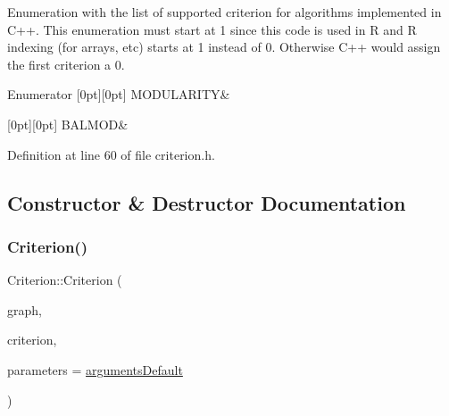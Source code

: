 Enumeration with the list of supported criterion for algorithms implemented in C++. This enumeration must start at 1 since this code is used in R and R indexing (for arrays, etc) starts at 1 instead of 0. Otherwise C++ would assign the first criterion a 0. \begin{DoxyEnumFields}{Enumerator}
[0pt][0pt]{}\mbox{\label{classCriterion_a55594c223ce0837b8319c46c66cb648fa2a7d416fbe43baf234420601ea73d946}} 
M\+O\+D\+U\+L\+A\+R\+I\+TY&\\
\hline

[0pt][0pt]{}\mbox{\label{classCriterion_a55594c223ce0837b8319c46c66cb648fa2ca6c7acaa036f0d3b18d83b688b2df9}} 
B\+A\+L\+M\+OD&\\
\hline

\end{DoxyEnumFields}


Definition at line 60 of file criterion.\+h.



\subsection{Constructor \& Destructor Documentation}
\mbox{\label{classCriterion_ac880ed791be9ad5cf41fe8561bdec35f}} 
\subsubsection{\texorpdfstring{Criterion()}{Criterion()}}
{\footnotesize\ttfamily Criterion\+::\+Criterion (\begin{DoxyParamCaption}\item[{const \hyperlink{classGraphUndirectedGroupable}{Graph\+Undirected\+Groupable} \&}]{graph,  }\item[{const \hyperlink{classCriterion_a55594c223ce0837b8319c46c66cb648f}{C\+R\+I\+T\+E\+R\+I\+ON} \&}]{criterion,  }\item[{const \hyperlink{structProgramParameters}{Program\+Parameters} \&}]{parameters = {\ttfamily \hyperlink{program_8h_ae2d819404495f80f31db7676c1329d19}{arguments\+Default}} }\end{DoxyParamCaption})\hspace{0.3cm}{\ttfamily [inline]}}

